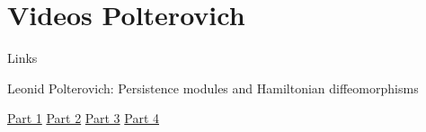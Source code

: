 \documentclass{beamer}
\begin{document}
\section{Videos Polterovich}
\begin{frame}{Links}

Leonid Polterovich: Persistence modules and Hamiltonian diffeomorphisms 
\begin{center}
     \href{https://www.youtube.com/watch?v=PH895gWDo2c}{Part 1}\hspace{5pt}
    \href{https://www.youtube.com/watch?v=9GvpXk_IhAA}{Part 2}\hspace{5pt}
    \href{https://www.youtube.com/watch?v=WEBNqTSiJCk}{Part 3}\hspace{5pt}
    \href{https://www.youtube.com/watch?v=IUUXXpjRJ3c&t=1593s}{Part 4}
\end{center}
   


\end{frame}
\end{document}
